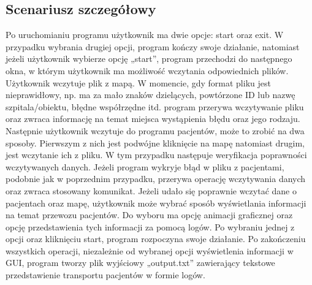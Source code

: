 \documentclass{article}
\begin{document}
\subsection{Scenariusz szczegółowy}
{\fontsize{14}{14}\selectfont 
Po uruchomianiu programu użytkownik ma dwie opcje: start oraz exit. W przypadku wybrania drugiej opcji, program kończy swoje działanie, natomiast jeżeli użytkownik wybierze opcję „start”, program przechodzi do następnego okna, w którym użytkownik ma możliwość wczytania odpowiednich plików.
\newline 
Użytkownik wczytuje plik z mapą. W momencie, gdy format pliku jest nieprawidłowy, np. ma za mało znaków dzielących, powtórzone ID lub nazwę szpitala/obiektu, błędne współrzędne itd. program przerywa wczytywanie pliku oraz zwraca informację na temat miejsca wystąpienia błędu oraz jego rodzaju. Następnie użytkownik wczytuje do programu pacjentów, może to zrobić na dwa sposoby. Pierwszym z nich jest podwójne kliknięcie na mapę natomiast drugim, jest wczytanie ich z pliku. W tym przypadku następuje weryfikacja poprawności wczytywanych danych. Jeżeli program wykryje błąd w pliku z pacjentami, podobnie jak w poprzednim przypadku, przerywa operację wczytywania danych oraz zwraca stosowany komunikat. 
\newline
Jeżeli udało się poprawnie wczytać dane o pacjentach oraz mapę, użytkownik może wybrać sposób wyświetlania informacji na temat przewozu pacjentów. Do wyboru ma opcję animacji graficznej oraz opcję przedstawienia tych informacji za pomocą logów. Po wybraniu jednej z opcji oraz kliknięciu start, program rozpoczyna swoje działanie. Po zakończeniu wszystkich operacji, niezależnie od wybranej opcji wyświetlenia informacji w GUI, program tworzy plik wyjściowy „output.txt” zawierający tekstowe przedstawienie transportu pacjentów w formie logów. 
\newline }
\pagebreak
\end{document}
